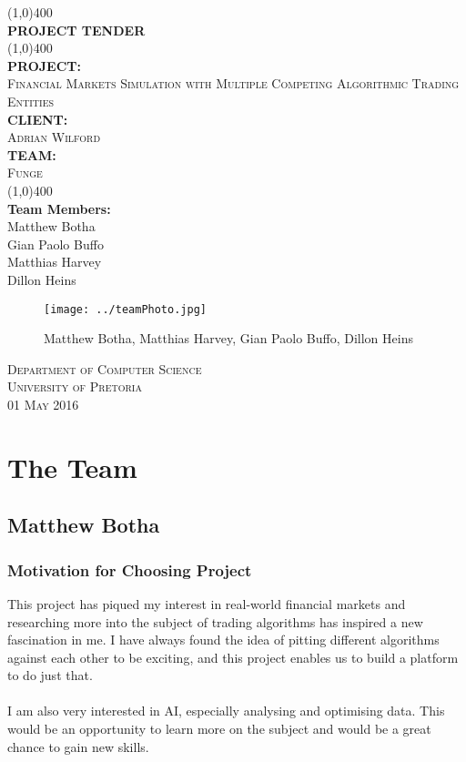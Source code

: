 \documentclass{article}
\begin{document}
\begin{titlepage}
	\begin{center}
		\line(1,0){400}\\
		[6mm]
		\huge{\bfseries PROJECT TENDER}\\
		[2mm]
		\line(1,0){400}\\
		[5mm]
		\large\textbf{PROJECT:}\\\textsc{Financial Markets Simulation with Multiple Competing Algorithmic Trading Entities}\\
		[3mm]
		\large\textbf{CLIENT:}\\\textsc{Adrian Wilford}\\
		[3mm]
		\large \textbf{TEAM:}\\\textsc{Funge}\\
		\line(1,0){400}\\
		[5mm]
		\large \textbf{Team Members:}\\
		[3mm]
		\large Matthew Botha\\
		\large Gian Paolo Buffo\\
		\large Matthias Harvey\\
        \large Dillon Heins\\[3mm]
		\begin{figure}[H]
			\centering
			\texttt{[image: ../teamPhoto.jpg]}
			\caption{Matthew Botha, Matthias Harvey, Gian Paolo Buffo, Dillon Heins}
		\end{figure}
    \end{center}

    \begin{flushright}
        \textsc{\large Department of Computer Science\\
        University of Pretoria\\
        01 May 2016\\}
    \end{flushright}
\end{titlepage}

\section{The Team}
	\subsection{Matthew Botha}
		
		\subsubsection{Motivation for Choosing Project}
			This project has piqued my interest in real-world financial markets and researching more into the subject of trading algorithms has inspired a new fascination in me.	I have always found the idea of pitting different algorithms against each other to be exciting, and this project enables us to build a platform to do just that.
			\\\\
			I am also very interested in AI, especially analysing and optimising data. This would be an opportunity to learn more on the subject and would be a great chance to gain new skills.
			
\end{document}
